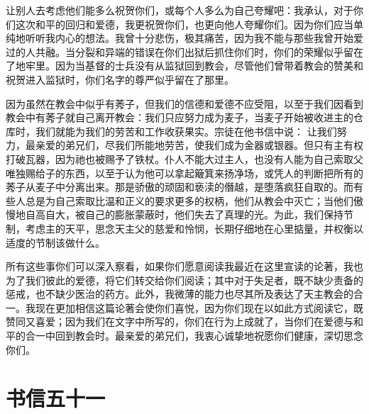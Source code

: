 让别人去考虑他们能多么祝贺你们，或每个人多么为自己夸耀吧：我承认，对于你们这次和平的回归和爱德，我更祝贺你们，也更向他人夸耀你们。因为你们应当单纯地听听我内心的想法。我曾十分悲伤，极其痛苦，因为我不能与那些我曾开始爱过的人共融。当分裂和异端的错误在你们出狱后抓住你们时，你们的荣耀似乎留在了地牢里。因为当基督的士兵没有从监狱回到教会，尽管他们曾带着教会的赞美和祝贺进入监狱时，你们名字的尊严似乎留在了那里。\par

因为虽然在教会中似乎有莠子，但我们的信德和爱德不应受阻，以至于我们因看到教会中有莠子就自己离开教会：我们只应努力成为麦子，当麦子开始被收进主的仓库时，我们就能为我们的劳苦和工作收获果实。宗徒在他书信中说： 让我们努力，最亲爱的弟兄们，尽我们所能地劳苦，使我们成为金器或银器。但只有主有权打破瓦器，因为祂也被赐予了铁杖。仆人不能大过主人，也没有人能为自己索取父唯独赐给子的东西，以至于认为他可以拿起簸箕来扬净场，或凭人的判断把所有的莠子从麦子中分离出来。那是骄傲的顽固和亵渎的僭越，是堕落疯狂自取的。而有些人总是为自己索取比温和正义的要求更多的权柄，他们从教会中灭亡；当他们傲慢地自高自大，被自己的膨胀蒙蔽时，他们失去了真理的光。为此，我们保持节制，考虑主的天平，思念天主父的慈爱和怜悯，长期仔细地在心里掂量，并权衡以适度的节制该做什么。\par

所有这些事你们可以深入察看，如果你们愿意阅读我最近在这里宣读的论著，我也为了我们彼此的爱德，将它们转交给你们阅读；其中对于失足者，既不缺少责备的惩戒，也不缺少医治的药方。此外，我微薄的能力也尽其所及表达了天主教会的合一。我现在更加相信这篇论著会使你们喜悦，因为你们现在以如此方式阅读它，既赞同又喜爱；因为我们在文字中所写的，你们在行为上成就了，当你们在爱德与和平的合一中回到教会时。最亲爱的弟兄们，我衷心诚挚地祝愿你们健康，深切思念你们。\par



\section{书信五十一}

\par

